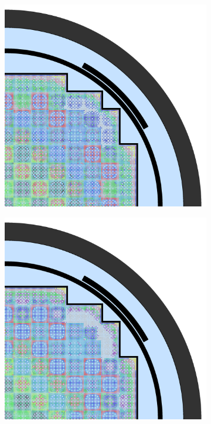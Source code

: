\begin{appendices}
\begin{figure}[h!]
\begin{subfigure}{0.48\textwidth}
  \caption{}
  \label{fig:no-features-full-core-combined-4}
\end{subfigure}
\begin{subfigure}{0.48\textwidth}
  \centering
  \includegraphics[width=0.85\linewidth]{figures/unsupervised/geometries/without-features/8-clusters/pinch/full-core}
  \caption{}
  \label{fig:no-features-full-core-pinch-8}
\end{subfigure}%
\begin{subfigure}{0.48\textwidth}
  \centering
  \includegraphics[width=0.85\linewidth]{figures/unsupervised/geometries/without-features/8-clusters/combined/full-core}

\end{subfigure}
\end{figure}
\end{appendices}
